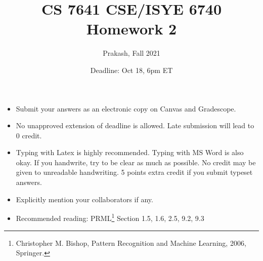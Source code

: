 \documentclass[twoside,10pt]{article}
\begin{document}
\title{CS 7641 CSE/ISYE 6740 Homework 2}
\author{Prakash, Fall 2021}
\date{Deadline: Oct 18, 6pm ET
} \maketitle

\begin{itemize}
  \item Submit your answers as an electronic copy on Canvas and Gradescope.
  \item No unapproved extension of deadline is allowed. Late
  submission will lead to 0 credit.
  \item Typing with Latex is highly recommended. Typing with MS Word is also okay.
  If you handwrite, try to be clear as much as possible. No credit may be given to unreadable handwriting. 5 points extra credit if you submit typeset answers. 
  \item Explicitly mention your collaborators if any.
  \item Recommended reading: PRML\footnote{Christopher M. Bishop, Pattern Recognition and Machine
Learning, 2006, Springer.} Section 1.5, 1.6, 2.5, 9.2, 9.3

\end{itemize}
\end{document}
